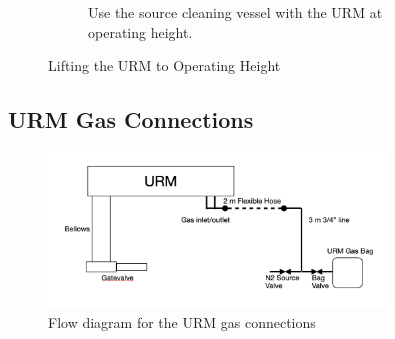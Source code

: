 \documentclass[11pt]{article}
\begin{document}
\begin{figure}
\begin{subfigure}{0.8\textwidth}
    \caption{Use the source cleaning vessel with the URM at operating height.}
    \label{fig:URMSCV}
  \end{subfigure}
  \caption{Lifting the URM to Operating Height}
\end{figure}

\subsection{URM Gas Connections}\label{ss:CGConnection}
\begin{figure}
  \begin{center}
    \includegraphics[width=0.8\textwidth]{URMGasFlowDiagram}
  \end{center}
  \caption{Flow diagram for the URM gas connections}
  \label{fig:URMGas}
\end{figure}
\end{document}
